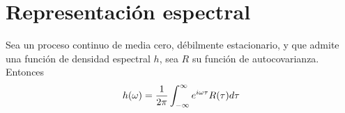 
\section{Representación espectral}
\label{sec:representacion}

\begin{teorema}
Sea \xt un proceso continuo de media cero, débilmente estacionario, y que admite una función de densidad espectral $h$, sea $R$ su función de autocovarianza. Entonces
\begin{equation}
h(\omega) = \frac{1}{2\pi} \int_{-\infty}^{\infty} e^{i \omega \tau} R(\tau) d\tau
\end{equation}
\label{teo:corr_four}
\end{teorema}
